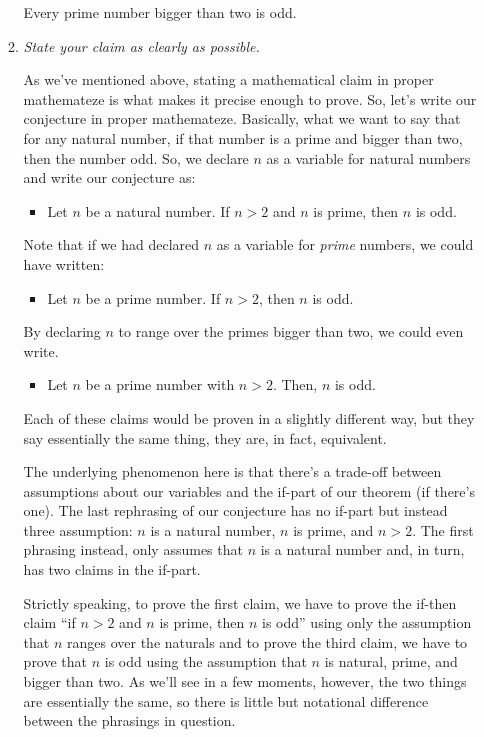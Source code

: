 \begin{enumerate}[{\thesection}.1]
\begin{enumerate}[\thesection.{7}.1]
				\begin{conjecture}
				Every prime number bigger than two is odd.
				\end{conjecture}
				
			\item \emph{State your claim as clearly as possible.}
									
			As we've mentioned above, stating a mathematical claim in proper mathemateze is what makes it precise enough to prove. So, let's write our conjecture in proper mathemateze. Basically, what we want to say that for any natural number, if that number is a prime and bigger than two, then the number odd. So, we declare $n$ as a variable for natural numbers and write our conjecture as:
			
			\begin{itemize}
			
				\item Let $n$ be a natural number. If $n>2$ and $n$ is prime, then $n$ is odd.
			
			\end{itemize} 
Note that if we had declared $n$ as a variable for \emph{prime} numbers, we could have written:
			\begin{itemize}
			
				\item Let $n$ be a prime number. If $n>2$, then $n$ is odd.
			
			\end{itemize}
By declaring $n$ to range over the primes bigger than two, we could even write.
			\begin{itemize}
			
				\item Let $n$ be a prime number with $n>2$. Then, $n$ is odd.
			
			\end{itemize}
Each of these claims would be proven in a slightly different way, but they say essentially the same thing, they are, in fact, equivalent.

The underlying phenomenon here is that there's a trade-off between assumptions about our variables and the if-part of our theorem (if there's one). The last rephrasing of our conjecture has no if-part but instead three assumption: $n$ is a natural number, $n$ is prime, and $n>2$. The first phrasing instead, only assumes that $n$ is a natural number and, in turn, has two claims in the if-part. 

Strictly speaking, to prove the first claim, we have to prove the if-then claim ``if $n>2$ and $n$ is prime, then $n$ is odd'' using only the assumption that $n$ ranges over the naturals and to prove the third claim, we have to prove that $n$ is odd using the assumption that $n$ is natural, prime, and bigger than two. As we'll see in a few moments, however, the two things are essentially the same, so there is little but notational difference between the phrasings in question.
														

\end{enumerate}
\end{enumerate}
